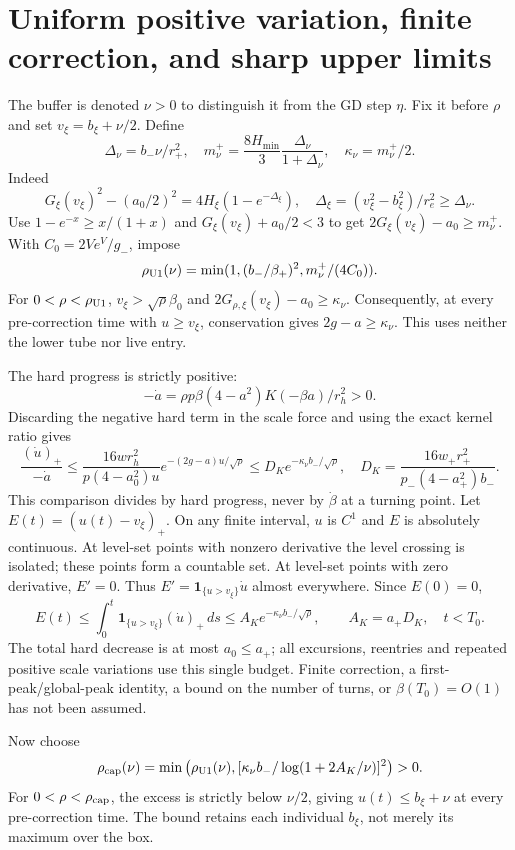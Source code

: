 \documentclass[11pt,a4paper]{article}
\begin{document}
\section{Uniform positive variation, finite correction, and sharp upper limits}

The buffer is denoted $\nu>0$ to distinguish it from the GD step $\eta$. Fix it before $\rho$ and set $v_\xi=b_\xi+\nu/2$. Define
\[
 \Delta_\nu=b_-\nu/r_+^2,\quad
 m_\nu^+=\frac{8H_{\min}}3\frac{\Delta_\nu}{1+\Delta_\nu},\quad
 \kappa_\nu=m_\nu^+/2 .
\]
Indeed
\[
 G_\xi(v_\xi)^2-(a_0/2)^2=4H_\xi(1-e^{-\Delta_\xi}),
 \quad\Delta_\xi=(v_\xi^2-b_\xi^2)/r_e^2\ge\Delta_\nu .
\]
Use $1-e^{-x}\ge x/(1+x)$ and $G_\xi(v_\xi)+a_0/2<3$ to get $2G_\xi(v_\xi)-a_0\ge m_\nu^+$. With $C_0=2Ve^V/g_-$, impose
\[
 \rho_{\rm U1}(\nu)=\min(1,(b_-/\beta_+)^2,m_\nu^+/(4C_0)).
\]
For $0<\rho<\rho_{\rm U1}$, $v_\xi>\sqrt\rho\beta_0$ and $2G_{\rho,\xi}(v_\xi)-a_0\ge\kappa_\nu$. Consequently, at every pre-correction time with $u\ge v_\xi$, conservation gives $2g-a\ge\kappa_\nu$. This uses neither the lower tube nor live entry.

The hard progress is strictly positive:
\[
 -\dot a=\rho p\beta(4-a^2)K(-\beta a)/r_h^2>0 .
\]
Discarding the negative hard term in the scale force and using the exact kernel ratio gives
\[
 \frac{(\dot u)_+}{-\dot a}
 \le\frac{16wr_h^2}{p(4-a_0^2)u}
             e^{-(2g-a)u/\sqrt\rho}
 \le D_K e^{-\kappa_\nu b_-/\sqrt\rho},\quad
 D_K=\frac{16w_+r_+^2}{p_-(4-a_+^2)b_-}.
\]
This comparison divides by hard progress, never by $\dot\beta$ at a turning point. Let $E(t)=(u(t)-v_\xi)_+$. On any finite interval, $u$ is $C^1$ and $E$ is absolutely continuous. At level-set points with nonzero derivative the level crossing is isolated; these points form a countable set. At level-set points with zero derivative, $E'=0$. Thus $E'=\mathbf1_{\{u>v_\xi\}}\dot u$ almost everywhere. Since $E(0)=0$,
\[
 E(t)\le\int_0^t\mathbf1_{\{u>v_\xi\}}(\dot u)_+\,ds
 \le A_K e^{-\kappa_\nu b_-/\sqrt\rho},\qquad A_K=a_+D_K,\quad t<T_0.
\]
The total hard decrease is at most $a_0\le a_+$; all excursions, reentries and repeated positive scale variations use this single budget. Finite correction, a first-peak/global-peak identity, a bound on the number of turns, or $\beta(T_0)=O(1)$ has not been assumed.

Now choose
\[
 \rho_{\rm cap}(\nu)=\min\left(\rho_{\rm U1}(\nu),
 [\kappa_\nu b_-/\log(1+2A_K/\nu)]^2\right)>0 .
\]
For $0<\rho<\rho_{\rm cap}$, the excess is strictly below $\nu/2$, giving $u(t)\le b_\xi+\nu$ at every pre-correction time. The bound retains each individual $b_\xi$, not merely its maximum over the box.
\end{document}
